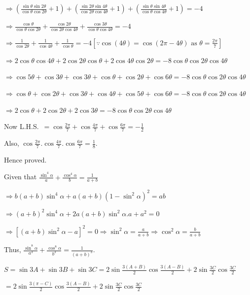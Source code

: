   $\Rightarrow \left(\frac{\sin\theta\sin2\theta}{\cos\theta\cos2\theta} + 1\right)
  + \left(\frac{\sin2\theta\sin4\theta}{\cos2\theta\cos4\theta} + 1\right)
  + \left(\frac{\sin\theta\sin4\theta}{\cos\theta\cos4\theta} + 1\right) = -4$

  $\Rightarrow \frac{\cos\theta}{\cos\theta\cos2\theta} + \frac{\cos2\theta}{\cos2\theta\cos4\theta}
  + \frac{\cos3\theta}{\cos\theta\cos4\theta} = -4$

  $\Rightarrow \frac{1}{\cos2\theta} + \frac{1}{\cos4\theta} + \frac{1}{\cos\theta} =
  -4\left[\because \cos(4\theta) = \cos(2\pi - 4\theta)\text{ as }\theta = \frac{2\pi}{7}\right]$

  $\Rightarrow 2\cos\theta\cos4\theta + 2\cos2\theta\cos\theta + 2\cos4\theta\cos2\theta =
  -8\cos\theta\cos2\theta\cos4\theta$

  $\Rightarrow \cos5\theta + \cos3\theta + \cos3\theta + \cos\theta + \cos2\theta + \cos6\theta =
  -8\cos\theta\cos2\theta\cos4\theta$

  $\Rightarrow \cos\theta + \cos2\theta + \cos3\theta + \cos4\theta + \cos5\theta + \cos6\theta =
  -8\cos\theta\cos2\theta\cos4\theta$

  $\Rightarrow 2\cos\theta + 2\cos2\theta + 2\cos3\theta = -8\cos\theta\cos2\theta\cos4\theta$

  Now L.H.S.\ $= \cos\frac{2\pi}{7} + \cos\frac{4\pi}{7} + \cos\frac{6\pi}{7} = -\frac{1}{2}$

  Also, $\cos\frac{2\pi}{7}.\cos\frac{4\pi}{7}.\cos\frac{6\pi}{7} = \frac{1}{8}$.

  Hence proved.
\item Given that $\frac{\sin^4\alpha}{a} + \frac{\cos^4\alpha}{b} = \frac{1}{a + b}$

  $\Rightarrow b(a + b)\sin^4\alpha + a(a + b)\left(1 - \sin^2\alpha\right)^2 = ab$

  $\Rightarrow (a + b)^2\sin^4\alpha + 2a(a + b)\sin^2\alpha.a + a^2 = 0$

  $\Rightarrow \left[(a + b)\sin^2\alpha - a\right]^2 = 0 \Rightarrow \sin^2\alpha = \frac{a}{a +
  b}\Rightarrow \cos^2\alpha = \frac{b}{a + b}$

  Thus, $\frac{\sin^8\alpha}{a^3} + \frac{\cos^8\alpha}{b^3} = \frac{1}{(a + b)^3}$.
\item $S = \sin3A + \sin3B + \sin3C = 2\sin\frac{3(A + B)}{2}\cos\frac{3(A - B)}{2} +
  2\sin\frac{3C}{2}\cos\frac{3C}{2}$

  $= 2\sin\frac{3(\pi - C)}{2}\cos\frac{3(A - B)}{2} + 2\sin\frac{3C}{2}\cos\frac{3C}{2}$

